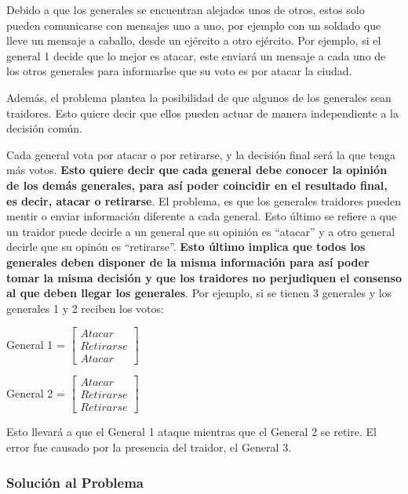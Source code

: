 Debido a que los generales se encuentran alejados unos de otros, estos solo pueden comunicarse con mensajes uno a uno, por ejemplo con un soldado que lleve un mensaje a caballo, desde un ejército a otro ejército. Por ejemplo, si el general 1 decide que lo mejor es atacar, este enviará un mensaje a cada uno de los otros generales para informarlse que su voto es por atacar la ciudad.

Además, el problema plantea la posibilidad de que algunos de los generales sean traidores. Esto quiere decir que ellos pueden actuar de manera independiente a la decisión común.

Cada general vota por atacar o por retirarse, y la decisión final será la que tenga más votos. \textbf{Esto quiere decir que cada general debe conocer la opinión de los demás generales, para así poder coincidir en el resultado final, es decir, atacar o retirarse}. El problema, es que los generales traidores pueden mentir o enviar información diferente a cada general. Esto último se refiere a que un traidor puede decirle a un general que su opinión es ``atacar'' y a otro general decirle que su opinón es ``retirarse''. \textbf{Esto último implica que todos los generales deben disponer de la misma información para así poder tomar la misma decisión y que los traidores no perjudiquen el consenso al que deben llegar los generales}. Por ejemplo, si se tienen 3 generales y los generales 1 y 2 reciben los votos:

\begin{flushleft}
    General 1 = $\begin{bmatrix}
        Atacar\\
        Retirarse\\
        Atacar
    \end{bmatrix}$
\end{flushleft}

\begin{flushleft}
    General 2 = $\begin{bmatrix}
        Atacar\\
        Retirarse\\
        Retirarse
    \end{bmatrix}$
\end{flushleft}

Esto llevará a que el General 1 ataque mientras que el General 2 se retire. El error fue causado por la presencia del traidor, el General 3.

\subsubsection{Solución al Problema}

